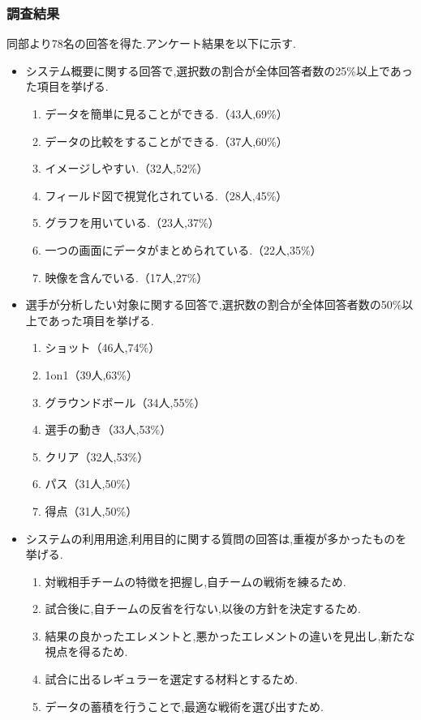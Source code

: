 \documentclass[sotsuron]{kuee}
\begin{document}
			\subsubsection{調査結果}
				同部より78名の回答を得た.アンケート結果を以下に示す.
				\begin{itemize}
				\item システム概要に関する回答で,選択数の割合が全体回答者数の25\%以上であった項目を挙げる.
					\begin{enumerate}
					\item データを簡単に見ることができる.（43人,69\%）
					\item データの比較をすることができる.（37人,60\%）
					\item イメージしやすい.（32人,52\%）
					\item フィールド図で視覚化されている.（28人,45\%）
					\item グラフを用いている.（23人,37\%）
					\item 一つの画面にデータがまとめられている.（22人,35\%）
					\item 映像を含んでいる.（17人,27\%）
					\end{enumerate}
				\item 選手が分析したい対象に関する回答で,選択数の割合が全体回答者数の50\%以上であった項目を挙げる.
					\begin{enumerate}
					\item ショット（46人,74\%）
					\item 1on1（39人,63\%）
					\item グラウンドボール（34人,55\%）
					\item 選手の動き（33人,53\%）
					\item クリア（32人,53\%）
					\item パス（31人,50\%）
					\item 得点（31人,50\%）
					\end{enumerate}
				\item システムの利用用途,利用目的に関する質問の回答は,重複が多かったものを挙げる.
					\begin{enumerate}
					\item 対戦相手チームの特徴を把握し,自チームの戦術を練るため.
					\item 試合後に,自チームの反省を行ない,以後の方針を決定するため.
					\item 結果の良かったエレメントと,悪かったエレメントの違いを見出し,新たな視点を得るため.
					\item 試合に出るレギュラーを選定する材料とするため.
					\item データの蓄積を行うことで,最適な戦術を選び出すため.
					\end{enumerate}
				\end{itemize}
\end{document}
